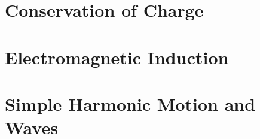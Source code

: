 \documentclass[]{exam}
\newif\ifShowUnitVIII    %
\newif\ifShowUnitIX      %
\newif\ifShowUnitX       %
\newif\ifShowUnitXI      %
\begin{document}
\ifShowUnitVIII

\fi

\section{Conservation of Charge}

\ifShowUnitIX

\fi

\section{Electromagnetic Induction}

\ifShowUnitX

\fi

\section{Simple Harmonic Motion and Waves}

\ifShowUnitXI

\fi
\end{document}
